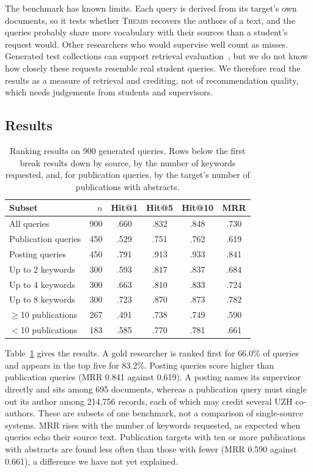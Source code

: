 \documentclass[sigconf,nonacm]{acmart}
\newcommand{\sys}{\textsc{Themis}}
\begin{document}
The benchmark has known limits. Each query is derived from its target's own documents, so it tests whether \sys{} recovers the authors of a text, and the queries probably share more vocabulary with their sources than a student's request would. Other researchers who would supervise well count as misses. Generated test collections can support retrieval evaluation~\cite{rahmani2024synthetic}, but we do not know how closely these requests resemble real student queries. We therefore read the results as a measure of retrieval and crediting, not of recommendation quality, which needs judgements from students and supervisors.

\subsection{Results}

\begin{table}[t]
\caption{Ranking results on 900 generated queries. Rows below the first break results down by source, by the number of keywords requested, and, for publication queries, by the target's number of publications with abstracts.}
\label{tab:main}
\small
\begin{tabular}{lrcccc}
\toprule
Subset & $n$ & Hit@1 & Hit@5 & Hit@10 & MRR \\
\midrule
All queries          & 900 & .660 & .832 & .848 & .730 \\
\midrule
Publication queries  & 450 & .529 & .751 & .762 & .619 \\
Posting queries      & 450 & .791 & .913 & .933 & .841 \\
\midrule
Up to 2 keywords     & 300 & .593 & .817 & .837 & .684 \\
Up to 4 keywords     & 300 & .663 & .810 & .833 & .724 \\
Up to 8 keywords     & 300 & .723 & .870 & .873 & .782 \\
\midrule
$\geq$10 publications & 267 & .491 & .738 & .749 & .590 \\
$<$10 publications    & 183 & .585 & .770 & .781 & .661 \\
\bottomrule
\end{tabular}
\end{table}

Table~\ref{tab:main} gives the results. A gold researcher is ranked first for 66.0\% of queries and appears in the top five for 83.2\%. Posting queries score higher than publication queries (MRR 0.841 against 0.619). A posting names its supervisor directly and sits among 695 documents, whereas a publication query must single out its author among 214,756 records, each of which may credit several UZH co-authors. These are subsets of one benchmark, not a comparison of single-source systems. MRR rises with the number of keywords requested, as expected when queries echo their source text. Publication targets with ten or more publications with abstracts are found less often than those with fewer (MRR 0.590 against 0.661), a difference we have not yet explained.
\end{document}

